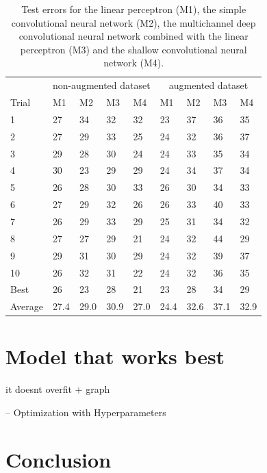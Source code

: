 \documentclass{article}
\begin{document}
 \begin{table}
 \begin{center}
    \begin{tabular}{ l l l l l l l l l}
\toprule
     $ $ & \multicolumn{4}{c}{non-augmented dataset} & \multicolumn{4}{c}{augmented dataset} \\
     \cmidrule(lr){2-5}
     \cmidrule(lr){6-9}
    Trial & M1 & M2 & M3 & M4 & M1 & M2 & M3 & M4  \\
\midrule
    1 & 27 & 34 & 32 & 32 & 23 & 37 & 36 & 35 \\
    2 & 27 & 29 & 33 & 25 & 24 & 32 & 36 & 37 \\
    3 & 29 & 28 & 30 & 24 & 24 & 33 & 35 & 34\\
    4 & 30 & 23 & 29 & 29 & 24 & 34 & 37 & 34\\
    5 & 26 & 28 & 30 & 33 & 26 & 30 & 34 & 33\\
    6 & 27 & 29 & 32 & 26 & 26 & 33 & 40 & 33\\
    7 & 26 & 29 & 33 & 29 & 25 & 31 & 34 & 32\\
    8 & 27 & 27 & 29 & 21 & 24 & 32 & 44 & 29\\
    9 & 29 & 31 & 30 & 29 & 24 & 32 & 39 & 37 \\
    10 & 26 & 32 & 31 & 22 & 24 & 32 & 36 & 35\\
    \midrule
    Best & 26 & 23 & 28 & 21 & 23 & 28 & 34 & 29 \\
    Average & 27.4 & 29.0 & 30.9 & 27.0 & 24.4 & 32.6 & 37.1 & 32.9 \\
\bottomrule
    \end{tabular}
        \caption{Test errors for the linear perceptron (M1), the simple convolutional neural network (M2), the multichannel deep convolutional neural network combined with the linear perceptron (M3) and the shallow convolutional neural network (M4).}
\end{center}
\label{tab_results}
\end{table}

  \section{Model that works best}\label{sec_themodel}
 
 it doesnt overfit + graph
 
 
 -- Optimization with Hyperparameters
  
 \section{Conclusion}\label{sec_conclusion}
 
 

 
  
  
  
\end{document}
